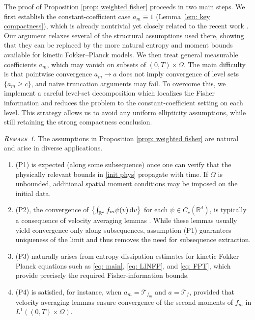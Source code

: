 \documentclass[10pt, reqno]{amsart}
\theoremstyle{plain}
\theoremstyle{definition}
\theoremstyle{remark}
\newtheorem{remark}[theorem]{\normalfont \scshape Remark}
\numberwithin{equation}{section}
\newcommand{\calT}{\mathcal T}
\newcommand{\R}{\mathbb{R}}
\newcommand{\dv}{\textnormal{d}v}
\newcommand{\intr}{\int_{\R^d}}
\begin{document}
The proof of Proposition \ref{prop: weighted fisher} proceeds in two main steps.
We first establish the constant-coefficient case $a_m\equiv 1$ (Lemma \ref{lem: key compactness}),
which is already nontrivial yet closely related to the recent work \cite{sampaio2024}.
Our argument relaxes several of the structural assumptions used there, showing
that they can be replaced by the more natural entropy and moment bounds available
for kinetic Fokker--Planck models.
We then treat general measurable coefficients $a_m$, which may vanish on subsets of
$(0,T)\times\Omega$. 
The main difficulty is that pointwise convergence $a_m\to a$ does not imply convergence of
level sets $\{a_m \ge c\}$, and naive truncation arguments may fail. 
To overcome this, we implement a careful level-set decomposition which localizes
the Fisher information and reduces the problem to the constant-coefficient setting on each level. This strategy allows us to avoid any uniform ellipticity assumptions, while still
retaining the strong compactness conclusion.

\begin{remark}
The assumptions in Proposition \ref{prop: weighted fisher} are natural and arise in diverse applications.
\begin{enumerate}
    \item (P1) is expected (along some subsequence) once one can verify that the physically relevant bounds in  \eqref{init phys} propagate with time. If $\Omega$ is unbounded, additional spatial moment conditions may be imposed on the initial data.
      \item (P2), the convergence of $\left\{\intr f_m \psi(v)\,\dv\right\}$ for each $\psi\in C_c(\R^d)$, is typically a consequence of velocity averaging lemmas \cite{GLPS88, GPS85, Glassey96}. While these lemmas usually yield convergence only along subsequences, assumption (P1) guarantees uniqueness of the limit and thus removes the need for subsequence extraction.
    \item (P3) naturally arises from entropy dissipation estimates for kinetic Fokker--Planck equations such as \eqref{eq: main}, \eqref{eq: LINFP}, and \eqref{eq: FPT}, which provide precisely the required Fisher-information bounds.
    \item (P4) is satisfied, for instance, when $a_m = \calT_{f_m}$ and $a = \calT_f$, provided that velocity averaging lemmas ensure convergence of the second moments of $f_m$ in $L^1((0,T)\times \Omega)$.
\end{enumerate}
\end{remark}
 
\end{document}
